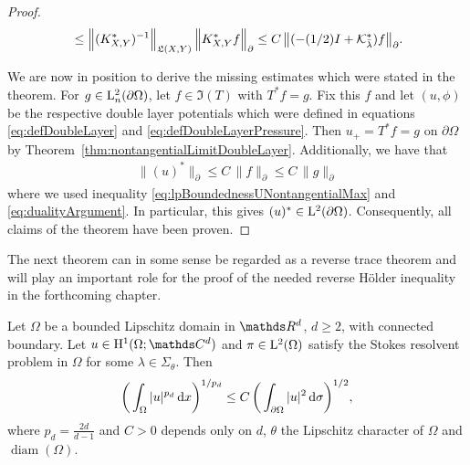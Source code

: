 \begin{proof}
\begin{align}
\begin{alignedat}{1}
      &\leq  \Big\| (K_{X,Y}^*)^{-1} \Big\|_{\Li(X,Y)}^{}\, \Big\| K_{X,Y}^* f\Big\|_\partial^{} %
    \leq C \, \big\|(-(1/2)I + \K_{\bar \lambda}^*)f \big\|_\partial^{}.
    \end{alignedat}
  \end{align}

  We are now in position to derive the missing estimates which were stated in the theorem.
  For $g \in \mathrm{L}^2_n(\partial\Omega)$, let $f \in \Im(T)$ with $T^* f = g$.
  Fix this $f$ and let $(u,\phi)$ be the respective double layer potentials which were defined in equations \eqref{eq:defDoubleLayer} and \eqref{eq:defDoubleLayerPressure}.
  Then $u_+ = T^* f =  g$ on $\partial\Omega$ by Theorem~\ref{thm:nontangentialLimitDoubleLayer}.
  Additionally, we have that
  \begin{align*}
    \|(u)^* \|_\partial^{} \leq C \, \|f\|_\partial^{} \leq C\, \| g\|_\partial^{}
  \end{align*}
  where we used inequality \eqref{eq:lpBoundednessUNontangentialMax} and \eqref{eq:dualityArgument}. In particular, this gives $(u)^* \in \mathrm{L}^2(\partial\Omega)$.
  Consequently, all claims of the theorem have been proven.
\end{proof}

The next theorem can in some sense be regarded as a reverse trace theorem and will play an important role for the proof of the needed reverse Hölder inequality in the forthcoming chapter.

\begin{thm}
  \label{thm:reverseTrace}
  Let $\Omega$ be a bounded Lipschitz domain in $\R^d$, $d \geq 2$, with connected boundary.
  Let $u \in \HH^1(\Omega; \C^d)$ and $\pi \in \mathrm{L}^2(\Omega)$ satisfy the Stokes resolvent problem in $\Omega$ for some $\lambda \in \Sigma_\theta$.
  Then
  \begin{align}
    \label{eq:reverseTrace}
    \bigg( \int_\Omega |u|^{p_d} \, {\operatorname{d}\!{x}} \bigg)^{1/{p_d}} \leq C\, \bigg( \int_{\partial\Omega} |u|^2 \, {\operatorname{d}\!{\sigma}} \bigg)^{1/2},
  \end{align}
  where $p_d = \frac{2d}{d - 1}$ and $C > 0$ depends only on $d$, $\theta$ the Lipschitz character of $\Omega$ and $\operatorname{diam}(\Omega)$.
\end{thm}

